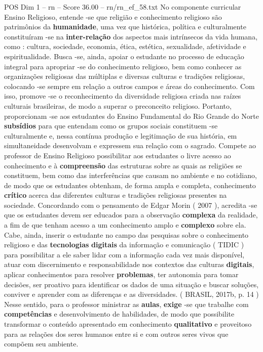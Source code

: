 \begin{textsample}{POS Dim 1 – rn – Score 36.00 – rn/rn\_ef\_58.txt}
No componente curricular Ensino Religioso, entende -se que religião e conhecimento religioso são patrimônios da \textbf{humanidade}, uma vez que histórica, política e culturalmente constituíram -se na \textbf{inter-relação} dos aspectos mais intrínsecos da vida humana, como : cultura, sociedade, economia, ética, estética, sexualidade, afetividade e espiritualidade.
Busca -se, ainda, apoiar o estudante no processo de educação integral para apropriar -se do conhecimento religioso, bem como conhecer as organizações religiosas das múltiplas e diversas culturas e tradições religiosas, colocando -se sempre em relação a outros campos e áreas do conhecimento.
Com isso, promove -se o reconhecimento da diversidade religiosa criada nas raízes culturais brasileiras, de modo a superar o preconceito religioso.
Portanto, proporcionam -se aos estudantes do Ensino Fundamental do Rio Grande do Norte \textbf{subsídios} para que entendam como os grupos sociais constituem -se culturalmente e, nessa contínua produção e legitimação de sua história, em simultaneidade desenvolvam e expressem sua relação com o sagrado.
Compete ao professor de Ensino Religioso possibilitar aos estudantes o livre acesso ao conhecimento e à \textbf{compreensão} das estruturas sobre as quais as religiões se constituem, bem como das interferências que causam no ambiente e no cotidiano, de modo que os estudantes obtenham, de forma ampla e completa, conhecimento \textbf{crítico} acerca das diferentes culturas e tradições religiosas presentes na sociedade.
Concordando com o pensamento de Edgar Morin ( 2007 ), acredita -se que os estudantes devem ser educados para a observação \textbf{complexa} da realidade, a fim de que tenham acesso a um conhecimento amplo e \textbf{complexo} sobre ela.
Cabe, ainda, inserir o estudante no campo das pesquisas sobre o conhecimento religioso e das \textbf{tecnologias} \textbf{digitais} da informação e comunicação ( TIDIC ) para possibilitar a ele saber lidar com a informação cada vez mais disponível, atuar com discernimento e responsabilidade nos contextos das culturas \textbf{digitais}, aplicar conhecimentos para resolver \textbf{problemas}, ter autonomia para tomar decisões, ser proativo para identificar os dados de uma situação e buscar soluções, conviver e aprender com as diferenças e as diversidades. ( BRASIL, 2017b, p. 14 ) Nesse sentido, para o professor ministrar as \textbf{aulas}, \textbf{exige} -se que trabalhe com \textbf{competências} e desenvolvimento de habilidades, de modo que possibilite transformar o conteúdo apresentado em conhecimento \textbf{qualitativo} e proveitoso para as relações dos seres humanos entre si e com outros seres vivos que compõem seu ambiente.

\end{textsample}
